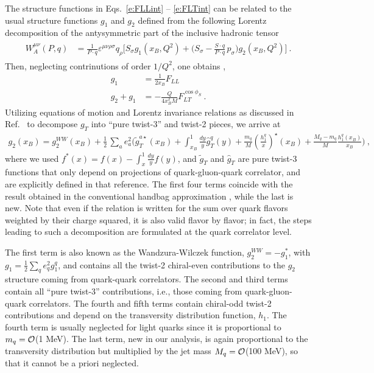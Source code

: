 \documentclass[preprintnumbers,floatfix,nofootinbib]{revtex4}
\newcommand{\xbj}{{x_B}}                   %
\newcommand{\mj}{M_q}
\newcommand{\mq}{m_q}
\begin{document}
The structure functions in Eqs.~\eqref{e:FLLint} -- \eqref{e:FLTint} can be
related to the usual structure functions $g_1$ and $g_2$ defined from the following Lorentz decomposition of the antysymmetric part of the inclusive hadronic tensor
\begin{align}
\begin{split}
W_A^{\mu\nu}(P,q) 
  & = \frac{1}{P\cdot q} \varepsilon^{\mu\nu\rho\sigma} q_\rho 
  \Big[ S_\sigma g_1(x_B,Q^2) 
    + \Big( S_\sigma - \frac{S\cdot q}{P\cdot q}\, p_\sigma
	\Big) g_2(x_B,Q^2)
  \Big] \ .
\label{eq:Wmunu}
\end{split}
\end{align}
Then, neglecting contrinutions of order $1/Q^2$, one obtains \cite{Bacchetta:2006tn},
\begin{align}
  g_1 &= \frac{1}{2x_B} F_{LL} \\
  g_2+g_1 &= - \frac{Q}{4 x_B^2 M} F_{LT}^{\cos \phi_S} \ .
\end{align}
Utilizing equations of motion and Lorentz invariance relations as discussed in Ref.~\cite{Accardi:2009au} to decompose $g_T$ into ``pure twist-3'' and twist-2 pieces, we arrive at
\begin{align}
\label{e:g2}
  g_2(\xbj) = g_2^{WW}(\xbj) + \frac{1}{2}\,\sum_a e_a^2
\biggl(
    \widetilde g_T^{a \star}(\xbj) 
    + \int_\xbj^1\frac{dy}{y} \widehat{g}_T^q(y) 
    + \frac{\mq}{M} \left(\frac{h_1^q}{x}\right)^\star(\xbj) 
    + \frac{\mj-\mq}{M} \frac{h_1^q(\xbj)}{\xbj} 
\Biggr) \ ,
\end{align}
where we used $f^*(x) = f(x) - \int_x^1\frac{dy}{y} f(y)$, and $\tilde g_T$ and $\hat g_T$ are pure twist-3 functions that only depend on projections of quark-gluon-quark correlator, and are explicitly defined in that reference. The first four terms coincide with the result obtained in the conventional handbag
approximation \cite{Accardi:2009au}, while the last is new. Note that even if
the relation is written for the sum over quark flavors weighted by their charge
squared, it is also valid flavor by flavor; in fact, the steps
leading to such a decomposition are formulated at the quark correlator level.

The first term is also known as the Wandzura-Wilczek function, $g_2^{WW} =
-g_1^*$, with $g_1=\frac12 \sum_q e_q^2 g_1^q$, and contains all the twist-2 chiral-even contributions to the $g_2$ structure coming from quark-quark correlators. The second and third
terms contain all ``pure twist-3'' contributions, i.e., those coming from
quark-gluon-quark correlators. The fourth and fifth terms contain chiral-odd twist-2 contributions and depend on the
transversity distribution function, $h_1$. 
The fourth term is usually neglected for
light quarks since it is proportional to $\mq={\cal O}$(1 MeV). The last term,
new in our analysis, is again proportional to the transversity distribution
but multiplied by the jet mass $\mj={\cal O}$(100 MeV), so that it cannot be a priori neglected.
\end{document}
